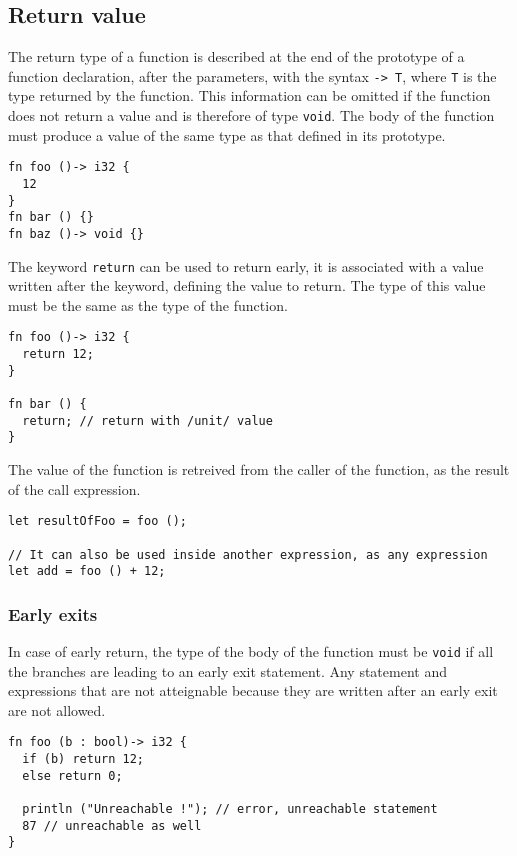 \subsection {Return value}

The return type of a function is described at the end of the prototype of a
function declaration, after the parameters, with the syntax \texttt{-> T}, where
\texttt{T} is the type returned by the function. This information can be omitted
if the function does not return a value and is therefore of type \texttt{void}.
The body of the function must produce a value of the same type as that defined
in its prototype.

\begin{lstlisting}[style=coloredverbatim]
fn foo ()-> i32 {
  12
}
fn bar () {}
fn baz ()-> void {}
\end{lstlisting}

The keyword \texttt{return} can be used to return early, it is associated with a
value written after the keyword, defining the value to return. The type of this
value must be the same as the type of the function.

\begin{lstlisting}[style=coloredverbatim]
fn foo ()-> i32 {
  return 12;
}

fn bar () {
  return; // return with /unit/ value
}
\end{lstlisting}

The value of the function is retreived from the caller of the function, as the
result of the call expression.

\begin{lstlisting}[style=coloredverbatim]
let resultOfFoo = foo ();

// It can also be used inside another expression, as any expression
let add = foo () + 12;
\end{lstlisting}

\subsubsection {Early exits}
\label{sec:function_early_return}

In case of early return, the type of the body of the function must be
\texttt{void} if all the branches are leading to an early exit statement. Any
statement and expressions that are not atteignable because they are written
after an early exit are not allowed.

\begin{lstlisting}[style=coloredverbatim]
fn foo (b : bool)-> i32 {
  if (b) return 12;
  else return 0;

  println ("Unreachable !"); // error, unreachable statement
  87 // unreachable as well
}
\end{lstlisting}

